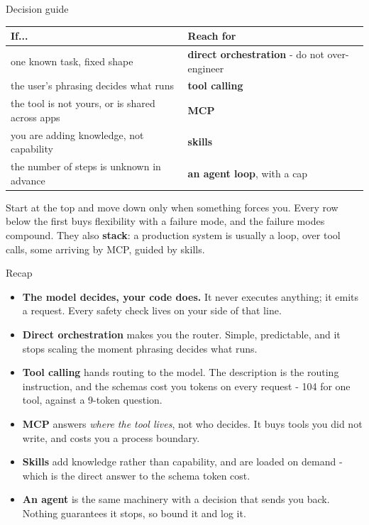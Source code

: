 \documentclass[aspectratio=169]{beamer}
\newcommand{\takebox}[1]{%
  \begin{tcolorbox}[colback=paramgreen!8, colframe=paramgreen, boxrule=0.6pt, arc=2pt]
  #1
  \end{tcolorbox}}
\begin{document}
\begin{frame}{Decision guide}
  \vspace{0.2em}
  \begin{center}
  \small
  \begin{tabular}{p{}p{}}
    \toprule
    \textbf{If...} & \textbf{Reach for} \\
    \midrule
    one known task, fixed shape & \textbf{direct orchestration} - do not over-engineer \\[0.1em]
    the user's phrasing decides what runs & \textbf{tool calling} \\[0.1em]
    the tool is not yours, or is shared across apps & \textbf{MCP} \\[0.1em]
    you are adding knowledge, not capability & \textbf{skills} \\[0.1em]
    the number of steps is unknown in advance & \textbf{an agent loop}, with a cap \\
    \bottomrule
  \end{tabular}
  \end{center}

  \vspace{0.2em}
  \takebox{\small Start at the top and move down only when something forces you. Every row
  below the first buys flexibility with a failure mode, and the failure modes compound. They
  also \textbf{stack}: a production system is usually a loop, over tool calls, some arriving by
  MCP, guided by skills.}
\end{frame}

\begin{frame}{Recap}
  \vspace{0.4em}
  \small
  \begin{itemize}
    \item \textbf{The model decides, your code does.} It never executes anything; it emits a
      request. Every safety check lives on your side of that line.
    \item \textbf{Direct orchestration} makes you the router. Simple, predictable, and it stops
      scaling the moment phrasing decides what runs.
    \item \textbf{Tool calling} hands routing to the model. The description is the routing
      instruction, and the schemas cost you tokens on every request - 104 for one tool, against
      a 9-token question.
    \item \textbf{MCP} answers \emph{where the tool lives}, not who decides. It buys tools you
      did not write, and costs you a process boundary.
    \item \textbf{Skills} add knowledge rather than capability, and are loaded on demand - which
      is the direct answer to the schema token cost.
    \item \textbf{An agent} is the same machinery with a decision that sends you back. Nothing
      guarantees it stops, so bound it and log it.
  \end{itemize}
\end{frame}
\end{document}
